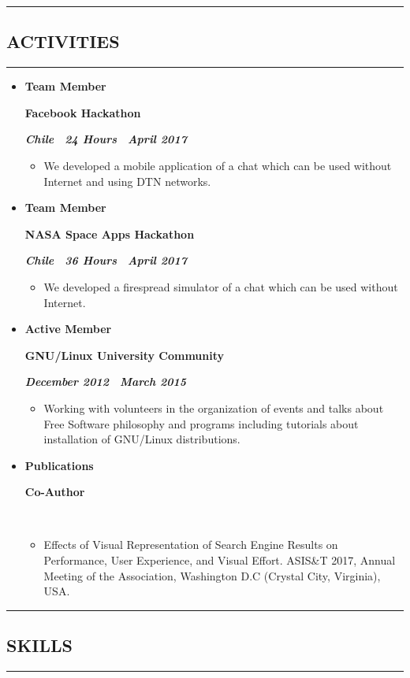 \documentclass[10pt,letterpaper]{article}
\newcommand{\textbox}[1]{
  \parbox{.333\textwidth}{#1}
}
\newcommand{\CPP}
{C\nolinebreak[4]\hspace{-.05em}\raisebox{.22ex}{\footnotesize\bf ++}}
\newcommand{\sectionTitle}[1]{
  \hrule
  \vspace{-1.0em} 
  \subsection*{\uppercase{\textbf{#1}} }
  \vspace{-0.3em}
    \hrule
    \vspace{0.3em}  
}
\newcommand{\titleExperienceWithoutLocation}[4]{
  \vspace{1.0em}
  \item[]
  {
    \textbox{\textbf{#1}\hfill}\textbox{\hfil \textbf{#2}\hfil}\hfill \textbf{\emph{#3 \textendash \ #4}}
  }
}
\begin{document}
  \vspace{0.30em} 
  \sectionTitle{Activities}
  \vspace{-0.8em}
  \begin{itemize}
    \parskip=-0.6em 
  
    \titleExperienceWithoutLocation{Team Member}{Facebook Hackathon}{Chile \textendash \ 24 Hours}{April 2017}
      \begin{itemize}[label=\textbullet]
        \itemsep0em
        \item We developed a mobile application of a chat which can be used without Internet and using DTN networks.
      \end{itemize}
  
    \vspace{-0.6em} 
    \titleExperienceWithoutLocation{Team Member}{NASA Space Apps Hackathon}{Chile \textendash \ 36 Hours}{April 2017}
      \begin{itemize}[label=\textbullet]
        \itemsep0em
        \item We developed a firespread simulator of a chat which can be used without Internet.
      \end{itemize}

    \titleExperienceWithoutLocation{Active Member}{GNU/Linux University Community}{December 2012}{March 2015}
\begin{itemize}[label=\textbullet]
  \itemsep0em
  \item Working with volunteers in the organization of events and talks about Free Software philosophy and programs including tutorials about installation of GNU/Linux distributions.
\end{itemize}

    \vspace{-0.6em} 
    \titleExperienceWithoutLocation{Publications}{Co-Author}{}{}
      \begin{itemize}[label=\textbullet]
        \itemsep0em
        \item Effects of Visual Representation of Search Engine Results on Performance, User Experience, and Visual Effort. ASIS\&T 2017,  Annual Meeting of the Association, Washington D.C (Crystal City, Virginia), USA.
      \end{itemize}
    \end{itemize} 
  \vspace{0.30em} 
  
  \sectionTitle{Skills}
  \vspace{0.20em}
  
\end{document}

